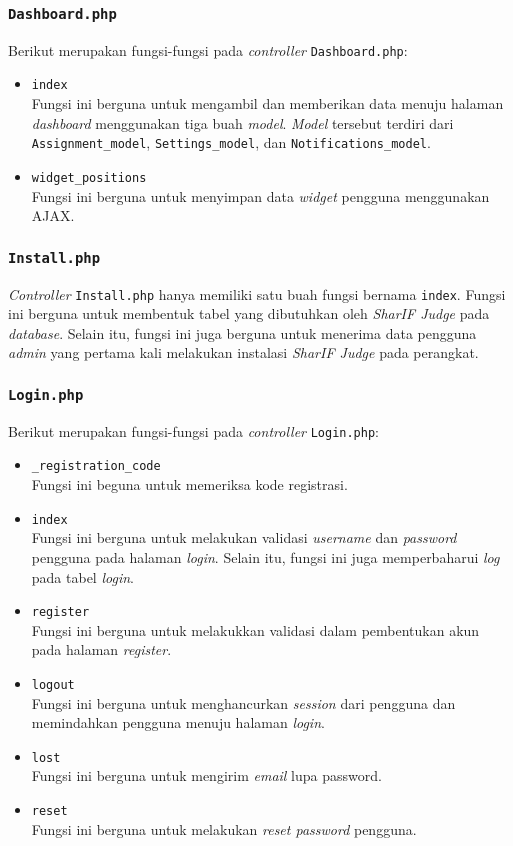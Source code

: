 \subsubsection{\texttt{Dashboard.php}}
Berikut merupakan fungsi-fungsi pada \textit{controller} \texttt{Dashboard.php}:
\begin{itemize}
	\item \texttt{index}\\
	Fungsi ini berguna untuk mengambil dan memberikan data menuju halaman \textit{dashboard} menggunakan tiga buah \textit{model}. \textit{Model} tersebut terdiri dari \texttt{Assignment\_model}, \texttt{Settings\_model}, dan \texttt{Notifications\_model}.
	\item \texttt{widget\_positions}\\
	Fungsi ini berguna untuk menyimpan data \textit{widget} pengguna menggunakan AJAX.
\end{itemize}
\subsubsection{\texttt{Install.php}}
\textit{Controller} \texttt{Install.php} hanya memiliki satu buah fungsi bernama \texttt{index}. Fungsi ini berguna untuk membentuk tabel yang dibutuhkan oleh \textit{SharIF Judge} pada \textit{database}. Selain itu, fungsi ini juga berguna untuk menerima data pengguna \textit{admin} yang pertama kali melakukan instalasi \textit{SharIF Judge} pada perangkat.

\subsubsection{\texttt{Login.php}}
Berikut merupakan fungsi-fungsi pada \textit{controller} \texttt{Login.php}:
\begin{itemize}
	\item \texttt{\_registration\_code}\\
	Fungsi ini beguna untuk memeriksa kode registrasi.
	\item \texttt{index}\\
	Fungsi ini berguna untuk melakukan validasi \textit{username} dan \textit{password} pengguna pada halaman \textit{login}. Selain itu, fungsi ini juga memperbaharui \textit{log} pada tabel \textit{login}.
	\item \texttt{register}\\
	Fungsi ini berguna untuk melakukkan validasi dalam pembentukan akun pada halaman \textit{register}.
	\item \texttt{logout}\\
	Fungsi ini berguna untuk menghancurkan \textit{session} dari pengguna dan memindahkan pengguna menuju halaman \textit{login}.
	\item \texttt{lost}\\
	Fungsi ini berguna untuk mengirim \textit{email} lupa password.
	\item \texttt{reset}\\
	Fungsi ini berguna untuk melakukan \textit{reset password} pengguna.
\end{itemize}

